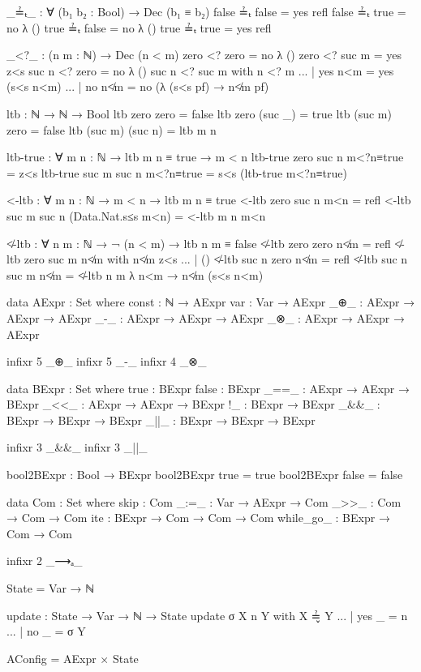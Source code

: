 \documentclass{lecturenotes}
\begin{document}
\begin{code}[hide]
_≟ₜ_ : ∀ (b₁ b₂ : Bool) → Dec (b₁ ≡ b₂)
false ≟ₜ false = yes refl
false ≟ₜ true = no λ ()
true ≟ₜ false = no λ ()
true ≟ₜ true = yes refl

_<?_ : (n m : ℕ) → Dec (n < m)
zero <? zero = no λ ()
zero <? suc m = yes z<s
suc n <? zero = no λ ()
suc n <? suc m with n <? m
... | yes n<m = yes (s<s n<m)
... | no n≮m = no (λ {(s<s pf) → n≮m pf}) 

ltb : ℕ → ℕ → Bool
ltb zero zero = false
ltb zero (suc _) = true
ltb (suc m) zero = false
ltb (suc m) (suc n) = ltb m n

ltb-true : ∀ {m n : ℕ} → ltb m n ≡ true → m < n
ltb-true {zero} {suc n} m<?n≡true = z<s
ltb-true {suc m} {suc n} m<?n≡true = s<s (ltb-true m<?n≡true)

<-ltb : ∀ {m n : ℕ} → m < n → ltb m n ≡ true
<-ltb {zero} {suc n} m<n = refl
<-ltb {suc m} {suc n} (Data.Nat.s≤s m<n) = <-ltb {m} {n} m<n

≮-ltb : ∀ {n m : ℕ} → ¬ (n < m) → ltb n m ≡ false
≮-ltb {zero} {zero} n≮m = refl
≮-ltb {zero} {suc m} n≮m with n≮m z<s
... | ()
≮-ltb {suc n} {zero} n≮m = refl
≮-ltb {suc n} {suc m} n≮m = ≮-ltb {n} {m} λ n<m → n≮m (s<s n<m)

data AExpr : Set where
  const : ℕ → AExpr
  var : Var → AExpr
  _⊕_ : AExpr → AExpr → AExpr
  _-_ : AExpr → AExpr → AExpr
  _⊗_ : AExpr → AExpr → AExpr

infixr 5 _⊕_
infixr 5 _-_
infixr 4 _⊗_

data BExpr : Set where
  true : BExpr
  false : BExpr
  _==_ : AExpr → AExpr → BExpr
  _<<_ : AExpr → AExpr → BExpr
  !_ : BExpr → BExpr
  _&&_ : BExpr → BExpr → BExpr
  _||_ : BExpr → BExpr → BExpr

infixr 3 _&&_
infixr 3 _||_

bool2BExpr : Bool → BExpr
bool2BExpr true = true
bool2BExpr false = false

data Com : Set where
  skip : Com
  _:=_ : Var → AExpr → Com
  _>>_ : Com → Com → Com
  ite : BExpr → Com → Com → Com
  while_go_ : BExpr → Com → Com


infixr 2 _⟶ₐ_

State = Var → ℕ

update : State → Var → ℕ → State
update σ X n Y with X ≟̬ Y
... | yes _ = n
... | no _ = σ Y 

AConfig = AExpr × State


\end{code}
\end{document}
